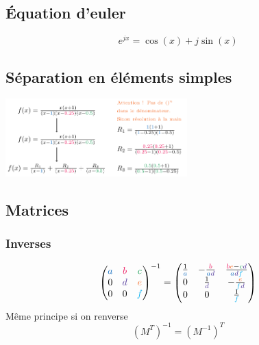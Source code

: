 \documentclass[resume]{subfiles}
\begin{document}
\subsection{Équation d'euler}
$$e^{jx}=\cos(x)+j\sin(x)$$
\subsection{Séparation en éléments simples}
\begin{center}
\includegraphics[width=7cm]{drwg_6.pdf}
\end{center}

\subsection{Matrices}
\subsubsection{Inverses}
$$\begin{pmatrix}
\textcolor{RoyalBlue}{a} & \textcolor{OrangeRed}{b} & \textcolor{ForestGreen}{c}\\
0 & \textcolor{Violet}{d} & \textcolor{Orange}{e}\\
0 & 0 & \textcolor{ProcessBlue}{f}
\end{pmatrix}^{-1}=\begin{pmatrix}
\frac{1}{\textcolor{RoyalBlue}{a}} & -\frac{\textcolor{OrangeRed}{b}}{\textcolor{RoyalBlue}{a}\textcolor{Violet}{d}} & \frac{\textcolor{OrangeRed}{b}\textcolor{Orange}{e}-\textcolor{ForestGreen}{c}\textcolor{Violet}{d}}{\textcolor{RoyalBlue}{a}\textcolor{Violet}{d}\textcolor{ProcessBlue}{f}}\\
0 & \frac{1}{\textcolor{Violet}{d}} & -\frac{\textcolor{Orange}{e}}{\textcolor{ProcessBlue}{f}\textcolor{Violet}{d}}\\
0 & 0 & \frac{1}{\textcolor{ProcessBlue}{f}}
\end{pmatrix}$$
Même principe si on renverse
$$\left(M^{T}\right)^{-1}=\left(M^{-1}\right)^{T}$$
\end{document}
